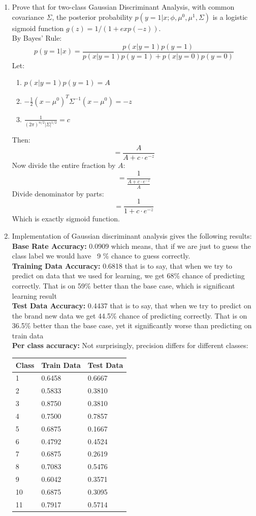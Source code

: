 \documentclass{article}
\begin{document}
\begin{enumerate}
		\item Prove that for two-class Gaussian Discriminant Analysis, with common covariance $\Sigma$, the posterior probability $p(y=1|x;\phi, \mu^0, \mu^1, \Sigma)$ is a logistic sigmoid function $g(z) = 1/(1+exp(-z))$.\\
		By Bayes' Rule:
		$$	p(y=1|x) = \frac{p(x|y=1)p(y=1)}{p(x|y=1)p(y=1) + p(x|y=0)p(y=0)}$$
		Let:
		\begin{enumerate}
			\item $p(x|y=1)p(y=1) = A$
			\item $-\frac{1}{2}(x-\mu^0)^T\Sigma^{-1} (x-\mu^0) = -z$
			\item $\frac{1}{(2\pi)^{n/2}|\Sigma|^{1/2}} = c$
		\end{enumerate} 
		Then:
		$$	 = \frac{A}{A + c \cdot e^{-z}}$$
		Now divide the entire fraction by $A$:
		$$	 = \frac{1}{\frac{A + c \cdot e^{-z}}{A}}$$
		Divide denominator by parts:
		$$= \frac{1}{1 + c \cdot e^{-z}}$$
		Which is exactly sigmoid function.
		
		\item Implementation of Gaussian discriminant analysis gives the following results:\\
		\textbf{Base Rate Accuracy:} 0.0909 which means, that if we are just to guess the class label we would have ~9 \% chance to guess correctly. \\	
		\textbf{Training Data Accuracy:}  0.6818 that is to say, that when we try to predict on data that we used for learning, we get 68\% chance of predicting correctly. That is on 59\% better than the base case, which is significant learning result \\	
		\textbf{Test Data Accuracy:}  0.4437 that is to say, that when we try to predict on the brand new data we get 44.5\% chance of predicting correctly. That is on 36.5\% better than the base case, yet it significantly worse than predicting on train data\\
		\textbf{Per class accuracy:} Not surprisingly, precision differs for different classes:\\
		\begin{table}[h!]	
			\begin{center}	
			\begin{tabular}{l l l}
				Class & Train Data & Test Data \\ \hline
				1 & 0.6458		 &    0.6667
				\\  2 &   0.5833 		 &    0.3810
				\\ 3 &   0.8750		 &    0.3810
				\\ 4 &   0.7500		 &    0.7857
				\\  5 &  0.6875		 &    0.1667
				\\   6 & 0.4792		 &    0.4524
				\\    7 & 0.6875		 &    0.2619
				\\    8 & 0.7083		 &    0.5476
				\\    9 & 0.6042		 &    0.3571
				\\    10 & 0.6875		 &    0.3095
				\\    11 & 0.7917		 &    0.5714
				

\end{tabular}
\end{center}
\end{table}
\end{enumerate}
\end{document}
